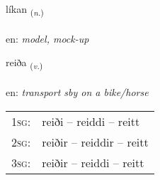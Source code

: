 \documentclass[frontgrid, backgrid]{flacards}\usepackage[]{graphicx}\usepackage[]{xcolor}
\begin{document}
\renewcommand{\flhead}{\vskip5pt \fboxsep=0pt {\small\bfseries\footnotesize Nafnorð | Noun}}
\renewcommand{\fcfoot}{\vskip5pt \fboxsep=0pt \hspace{2pt}{\small\bfseries\footnotesize 3K}}

\renewcommand{\blhead}{\vskip5pt {\small\bfseries\footnotesize Nafnorð | Noun }}
\renewcommand{\bcfoot}{\vskip5pt \hspace{2pt}{\small\bfseries\footnotesize 3K}}


{líkan \small{\textsubscript{(\textit{n.})}} \\[1ex] %
\textphonetic{[liːkan]} \\
en: \emph{model, mock-up} \\  [2ex]
\renewcommand*{\arraystretch}{0.8}
}

\renewcommand{\flhead}{\vskip5pt \fboxsep=0pt {\small\bfseries\footnotesize Sagnorð | Verb}}
\renewcommand{\fcfoot}{\vskip5pt \fboxsep=0pt \hspace{2pt}{\small\bfseries\footnotesize 3K}}

\renewcommand{\blhead}{\vskip5pt {\small\bfseries\footnotesize Sagnorð | Verb }}
\renewcommand{\bcfoot}{\vskip5pt \hspace{2pt}{\small\bfseries\footnotesize 3K}}


{reiða \small{\textsubscript{(\textit{v.})}} \\[1ex] %
\textphonetic{[reiːða]} \\
en: \emph{transport sby on a bike/horse} \\  [2ex]
\renewcommand*{\arraystretch}{0.8}
\begin{tabular}{p{1cm}l}
\textsc{1sg}: & reiði -- reiddi -- reitt \\ 
\textsc{2sg}: & reiðir -- reiddir -- reitt \\ 
\textsc{3sg}: & reiðir -- reiddi -- reitt \\ 
\end{tabular}
}
\end{document}
